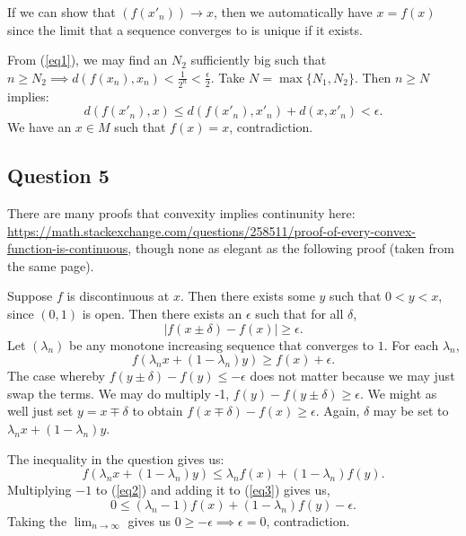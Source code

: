 \documentclass{article}
\begin{document}
If we can show that $(f(x'_n)) \to x$, then we automatically have $x=f(x)$ since the limit that a sequence converges to is unique if it exists.

From (\ref{eq1}), we may find an $N_2$ sufficiently big such that $n \geq N_2 \implies d(f(x_n), x_n) < \frac{1}{2^n}< \frac{\epsilon}{2}$. Take $N=\max\{N_1, N_2 \}$. Then $n \geq N$ implies:
\begin{equation*}
    d(f(x'_n), x) \leq d(f(x'_n), x'_n) + d(x, x'_n) < \epsilon.
\end{equation*}
We have an $x \in M$ such that $f(x)=x$, contradiction.

\subsection*{Question 5}
There are many proofs that convexity implies continunity here: \url{https://math.stackexchange.com/questions/258511/proof-of-every-convex-function-is-continuous}, though none as elegant as the following proof (taken from the same page).

Suppose $f$ is discontinuous at $x$. Then there exists some $y$ such that $0<y<x$, since $(0,1)$ is open. Then there exists an $\epsilon$ such that for all $\delta$, 
\begin{equation*}
    |f(x \pm \delta)-f(x)| \geq \epsilon.
\end{equation*}
Let $(\lambda_n)$ be any monotone increasing sequence that converges to $1$. For each $\lambda_n$, 
\begin{equation}
    f(\lambda_nx+(1-\lambda_n)y)\geq f(x)+\epsilon. \label{eq2}
\end{equation}
The case whereby $f(y \pm \delta) -f(y) \leq -\epsilon$ does not matter because we may just swap the terms. We may do multiply -1, $f(y) -f(y \pm \delta) \geq \epsilon$. We might as well just set $y=x \mp \delta$ to obtain $
f(x \mp \delta)-f(x) \geq \epsilon$. Again, $\delta$ may be set to $\lambda_nx+(1-\lambda_n)y$.

The inequality in the question gives us:
\begin{equation}
    f(\lambda_nx+(1-\lambda_n)y)\leq \lambda_nf(x)+(1-\lambda_n)f(y). \label{eq3}
\end{equation}
Multiplying $-1$ to (\ref{eq2}) and adding it to (\ref{eq3}) gives us,
\begin{equation*}
    0\leq (\lambda_n-1)f(x)+(1-\lambda_n)f(y)-\epsilon.
\end{equation*}
Taking the $\lim_{n \to \infty}$ gives us $0 \geq -\epsilon \implies \epsilon=0$, contradiction.
\end{document}
